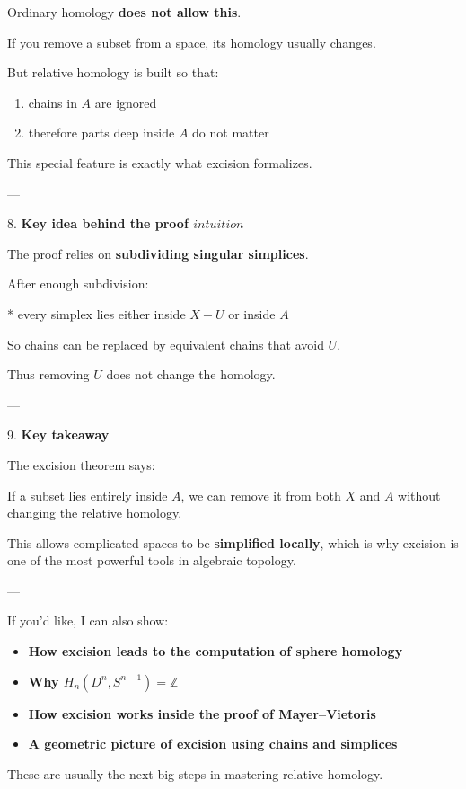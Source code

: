 \documentclass[12pt,a4paper]{report}
\begin{document}
\begin{description}
\begin{description}
Ordinary homology \textbf{does not allow this}.

If you remove a subset from a space, its homology usually changes.

But relative homology is built so that:

\begin{enumerate}

\item chains in $A$ are ignored
\item therefore parts deep inside $A$ do not matter
\end{enumerate}

This special feature is exactly what excision formalizes.

---

\item 8. \textbf{Key idea behind the proof $intuition$}

The proof relies on \textbf{subdividing singular simplices}.

After enough subdivision:

* every simplex lies either inside $X-U$ or inside $A$

So chains can be replaced by equivalent chains that avoid $U$.

Thus removing $U$ does not change the homology.

---

\item 9. \textbf{Key takeaway}

The excision theorem says:

\> If a subset lies entirely inside $A$, we can remove it from both $X$ and $A$ without changing the relative homology.

This allows complicated spaces to be \textbf{simplified locally}, which is why excision is one of the most powerful tools in algebraic topology.

\end{description}

---

If you'd like, I can also show:

\begin{itemize}
\item \textbf{How excision leads to the computation of sphere homology}
\item \textbf{Why $H_n(D^n,S^{n-1})=\mathbb{Z}$}
\item \textbf{How excision works inside the proof of Mayer–Vietoris}
\item \textbf{A geometric picture of excision using chains and simplices}
\end{itemize}

These are usually the next big steps in mastering relative homology.

\end{description}
\end{document}
